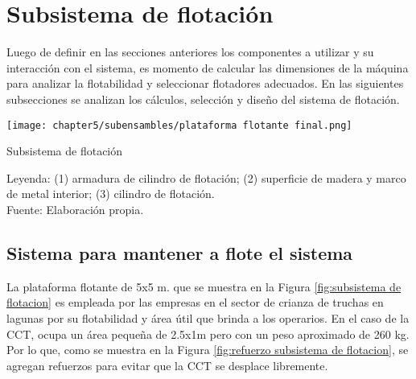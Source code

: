 \vspace{-2.0 em}


\section{Subsistema de flotación}

Luego de definir en las secciones anteriores los componentes a utilizar y su interacción con el sistema, es momento de calcular las dimensiones de la máquina para analizar la flotabilidad y seleccionar flotadores adecuados. En las siguientes subsecciones se analizan los cálculos, selección y diseño del sistema de flotación.%

\begin{myfigure}[H]
	\footnotesize\centering
	\texttt{[image: chapter5/subensambles/plataforma flotante final.png]}
	\caption{Subsistema de flotación}
	\begin{myflushcenter}
		Leyenda: (1) armadura de cilindro de flotación; (2) superficie de madera y marco de metal interior; (3) cilindro de flotación.\\
		Fuente: Elaboración propia.
	\end{myflushcenter}
	\label{fig:subsistema de flotacion}
\end{myfigure}

\vspace{-2.0em}

\subsection{Sistema para mantener a flote el sistema}

La plataforma flotante de 5x5 m. que se muestra en la Figura \ref{fig:subsistema de flotacion} es empleada por las empresas en el sector de crianza de truchas en lagunas por su flotabilidad y área útil que brinda a los operarios. En el caso de la CCT, ocupa un área pequeña de 2.5x1m pero con un peso aproximado de 260 kg. Por lo que, como se muestra en la Figura \ref{fig:refuerzo subsistema de flotacion}, se agregan refuerzos para evitar que la CCT se desplace libremente.

